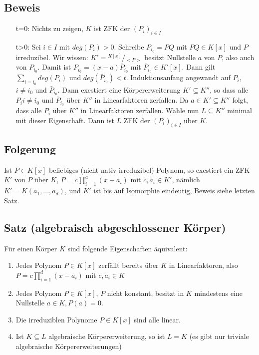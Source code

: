 \documentclass[12pt,a4paper,ngerman]{scrreprt}
\newcommand{\modulus}[2]{{}^{#1} \!/\!_{#2}}
\begin{document}
\subsection{Beweis}
\begin{enumerate}[(1)]
\item[t=0:] Nichts zu zeigen, $K$ ist ZFK der $(P_i)_{i \in I}$
\item[t>0:] Sei $i \in I$ mit $deg(P_i)>0$. Schreibe $P_{i_0} = PQ$ mit $PQ \in K[x]$ und $P$ irreduzibel.
Wir wissen: $K' = \modulus{K[x]}{<P>}$ besitzt Nullstelle $a$ von $P$,
also auch von $P_{i_0}$. Damit ist $P_{i_0} = (x-a)\bar{P}_{i_0}$ mit $\bar{P}_{i_0} \in K'[x]$.
Dann gilt $\sum_{i=i_0}{deg(P_i)}$ und $deg(\bar{P}_{i_0}) < t$.
Induktionsanfang angewandt auf $P_i$, $i \neq i_0$ und $\bar{P}_{i_0}$.
Dann exestiert eine Körpererweiterung $K' \subseteq K''$, 
so dass alle $P_i i \neq i_0$ und $\bar{P}_{i_0}$ über $K''$ in Linearfaktoren zerfallen.
Da $a \in K' \subseteq K''$ folgt, dass alle $P_i$ über $K''$ in Linearfaktoren zerfallen.
Wähle nun $L \subseteq K''$ minimal mit dieser Eigenschaft. Dann ist $L$ ZFK der $(P_i)_{i \in I}$ über $K$.
\end{enumerate}

\subsection{Folgerung}
Ist $P \in K[x]$ beliebiges (nicht nativ irreduzibel) Polynom,
so exestiert ein ZFK $K'$ von $P$ über $K$, $P=c \prod_{i=1}^{a}{(x-a_i)}$ mit $c, a_i \in K'$, 
nämlich $K'=K(a_1, ..., a_d)$, und $K'$ ist bis auf Isomorphie eindeutig, Beweis siehe letzten Satz.

\subsection{Satz (algebraisch abgeschlossener Körper)}
Für einen Körper $K$ sind folgende Eigenschaften äquivalent:
\begin{enumerate}[(1)]
\item Jedes Polynom $P \in K[x]$ zerfällt bereits über $K$ in Linearfaktoren, also $P = c\prod_{i=1}^{d}{(x-a_i)}$
mit $c, a_i \in K$
\item Jedes Polynom $P \in K[x]$, $P$ nicht konstant, besitzt in $K$ mindestens eine Nullstelle $a \in K, P(a) = 0$.
\item Die irreduziblen Polynome $P \in K[x]$ sind alle linear.
\item Ist $K \subseteq L$ algebraische Körpererweiterung, so ist $L=K$ (es gibt nur triviale algebraische Körpererweiterungen)
\end{enumerate}
\end{document}
